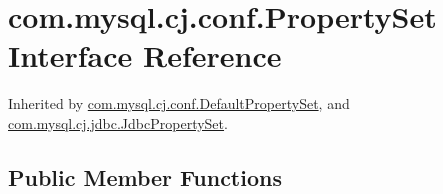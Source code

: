 \hypertarget{interfacecom_1_1mysql_1_1cj_1_1conf_1_1_property_set}{}\section{com.\+mysql.\+cj.\+conf.\+Property\+Set Interface Reference}
\label{interfacecom_1_1mysql_1_1cj_1_1conf_1_1_property_set}


Inherited by \mbox{\hyperlink{classcom_1_1mysql_1_1cj_1_1conf_1_1_default_property_set}{com.\+mysql.\+cj.\+conf.\+Default\+Property\+Set}}, and \mbox{\hyperlink{interfacecom_1_1mysql_1_1cj_1_1jdbc_1_1_jdbc_property_set}{com.\+mysql.\+cj.\+jdbc.\+Jdbc\+Property\+Set}}.

\subsection*{Public Member Functions}
